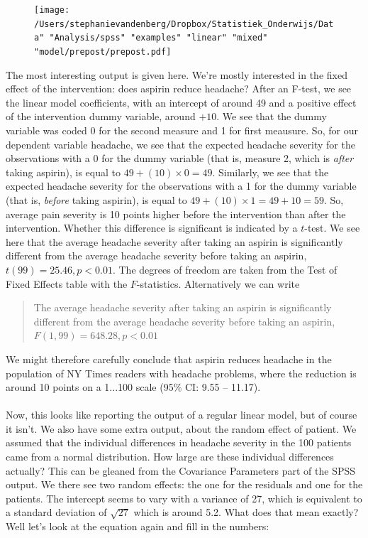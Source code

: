 \documentclass[]{report}\usepackage[]{graphicx}\usepackage[]{color}
\begin{document}
\begin{figure}[h]
    \begin{center}
       \texttt{[image: /Users/stephanievandenberg/Dropbox/Statistiek\_Onderwijs/Data" "Analysis/spss" "examples" "linear" "mixed" "model/prepost/prepost.pdf]}
    \end{center}
\end{figure}

The most interesting output is given here. We're mostly interested in the fixed effect of the intervention: does aspirin reduce headache? After an F-test, we see the linear model coefficients, with an intercept of around 49 and a positive effect of the intervention dummy variable, around $+10$. We see that the dummy variable was coded 0 for the second measure and 1 for first meausure. So, for our dependent variable headache, we see that the expected headache severity for the observations with a 0 for the dummy variable (that is, measure 2, which is \textit{after} taking aspirin), is equal to $49 + (10) \times 0 = 49$. Similarly, we see that the expected headache severity for the observations with a 1 for the dummy variable (that is, \textit{before} taking aspirin), is equal to $49 + (10) \times 1 = 49 + 10 = 59$. So, average pain severity is 10 points higher before the intervention than after the intervention. Whether this difference is significant is indicated by a $t$-test. We see here that the average headache severity after taking an aspirin is significantly different from the average headache severity before taking an aspirin, $t(99) = 25.46, p < 0.01$. The degrees of freedom are taken from the Test of Fixed Effects table with the $F$-statistics. Alternatively we can write 

\begin{quote}
{The average headache severity after taking an aspirin is significantly different from the average headache severity before taking an aspirin, $F(1,99) = 648.28, p < 0.01$}\end{quote}


We might therefore carefully conclude that aspirin reduces headache in the population of NY Times readers with headache problems, where the reduction is around 10 points on a 1...100 scale (95\% CI: 9.55 -- 11.17). 
\\
\\
Now, this looks like reporting the output of a regular linear model, but of course it isn't. We also have some extra output, about the random effect of patient. We assumed that the individual differences in headache severity in the 100 patients came from a normal distribution. How large are these individual differences actually? This can be gleaned from the Covariance Parameters part of the SPSS output. We there see two random effects: the one for the residuals and one for the patients. The intercept seems to vary with a variance of 27, which is equivalent to a standard deviation of $\sqrt{27}$ which is around 5.2. What does that mean exactly? Well let's look at the equation again and fill in the numbers:
\end{document}
